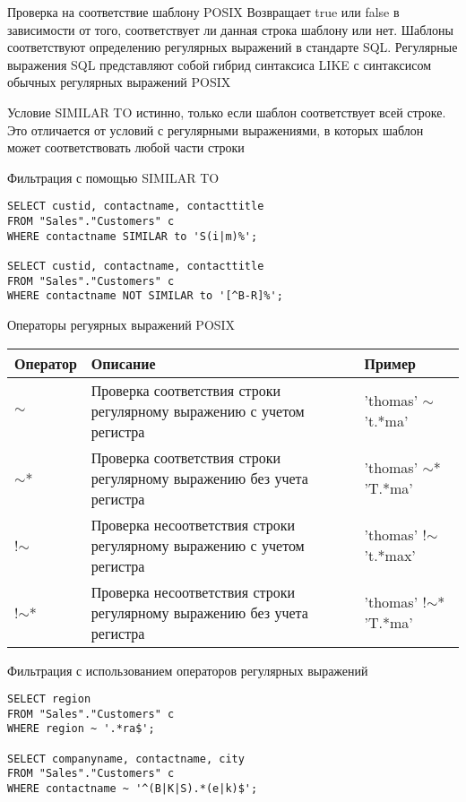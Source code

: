 \documentclass[12pt]{article}
\begin{document}
\begin{nota}{Проверка на соответствие шаблону POSIX}
    Возвращает true или false в зависимости от того, соответствует ли данная строка шаблону или нет. Шаблоны соответствуют определению регулярных выражений в стандарте SQL. Регулярные выражения SQL представляют собой гибрид синтаксиса LIKE с синтаксисом обычных регулярных выражений POSIX 

    Условие SIMILAR TO истинно, только если шаблон соответствует всей строке. Это отличается от условий с регулярными выражениями, в которых шаблон может соответствовать любой части строки
\end{nota}

\begin{Example}{Фильтрация с помощью SIMILAR TO}
\begin{lstlisting}
SELECT custid, contactname, contacttitle
FROM "Sales"."Customers" c
WHERE contactname SIMILAR to 'S(i|m)%';

SELECT custid, contactname, contacttitle
FROM "Sales"."Customers" c
WHERE contactname NOT SIMILAR to '[^B-R]%';
\end{lstlisting}
\end{Example}

\begin{nota}{Операторы регуярных выражений POSIX}
    \begin{center}
        \begin{tabular}{|m{3em}|m{20em}|m{10em}|}
            \hline
            Оператор & Описание & Пример \\
            \hline 
            $\sim$ & Проверка соответствия строки регулярному выражению с учетом регистра & 'thomas' $\sim$ 't.*ma' \\
            \hline
            $\sim$* & Проверка соответствия строки регулярному выражению без учета регистра & 'thomas' $\sim$* 'T.*ma' \\
            \hline
            !$\sim$ & Проверка несоответствия строки регулярному выражению с учетом регистра & 'thomas' !$\sim$ 't.*max' \\
            \hline
            !$\sim$* & Проверка несоответствия строки регулярному выражению без учета регистра & 'thomas' !$\sim$* 'T.*ma' \\
            \hline
        \end{tabular}
    \end{center}
\end{nota}

\begin{Example}{Фильтрация с использованием операторов регулярных выражений}
\begin{lstlisting}
SELECT region 
FROM "Sales"."Customers" c 
WHERE region ~ '.*ra$';

SELECT companyname, contactname, city 
FROM "Sales"."Customers" c 
WHERE contactname ~ '^(B|K|S).*(e|k)$';
\end{lstlisting}
\end{Example}
\end{document}
